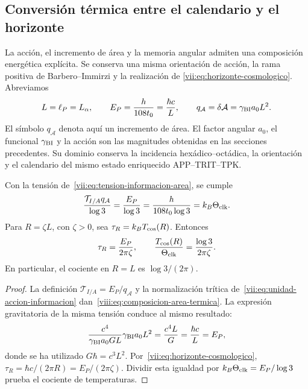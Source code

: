 
\subsection{Conversión térmica entre el calendario y el horizonte}
\label{viii:subsec:conversion-termica-calendario-horizonte}

La acción, el incremento de área y la memoria angular admiten una
composición energética explícita. Se conserva una misma orientación de
acción, la rama positiva de Barbero--Immirzi y la realización de
\eqref{vii:eq:horizonte-cosmologico}. Abreviamos
\[
 L=\ell_P=L_\alpha,\qquad
 E_P=\frac{h}{108t_0}=\frac{\hbar c}{L},\qquad
 q_{\mathcal A}=\delta\mathcal A=\gamma_{\rm BI}a_0L^2.
\]
El símbolo \(q_{\mathcal A}\) denota aquí un incremento de área.
El factor angular \(a_0\), el funcional \(\gamma_{\rm BI}\) y
la acción son las magnitudes obtenidas en las secciones precedentes.
Su dominio conserva la incidencia hexádico--octádica, la orientación y
el calendario del mismo estado enriquecido APP--TRIT--TPK.

\begin{proposition}
\label{viii:prop:composicion-area-termica}
Con la tensión de~\eqref{vii:eq:tension-informacion-area}, se cumple
\begin{equation}
 \frac{\mathcal T_{I/A}q_{\mathcal A}}{\log3}
 =\frac{E_P}{\log3}
 =\frac{h}{108t_0\log3}
 =k_B\Theta_{\rm clk}.
 \label{viii:eq:composicion-area-termica}
\end{equation}
Para \(R=\zeta L\), con \(\zeta>0\), sea
\(\tau_R=k_BT_{\rm cos}(R)\). Entonces
\begin{equation}
 \tau_R=\frac{E_P}{2\pi\zeta},\qquad
 \frac{T_{\rm cos}(R)}{\Theta_{\rm clk}}
 =\frac{\log3}{2\pi\zeta}.
 \label{viii:eq:conversion-dos-temperaturas}
\end{equation}
En particular, el cociente en \(R=L\) es \(\log3/(2\pi)\).
\end{proposition}
\begin{proof}
La definición \(\mathcal T_{I/A}=E_P/q_{\mathcal A}\) y la
normalización trítica de~\eqref{vii:eq:unidad-accion-informacion}
dan~\eqref{viii:eq:composicion-area-termica}. La expresión
gravitatoria de la misma tensión conduce al mismo resultado:
\[
 \frac{c^4}{\gamma_{\rm BI}a_0GL}
        \gamma_{\rm BI}a_0L^2
 =\frac{c^4L}{G}=\frac{\hbar c}{L}=E_P,
\]
donde se ha utilizado \(G\hbar=c^3L^2\).
Por~\eqref{vii:eq:horizonte-cosmologico},
\(\tau_R=\hbar c/(2\pi R)=E_P/(2\pi\zeta)\).
Dividir esta igualdad por \(k_B\Theta_{\rm clk}=E_P/\log3\)
prueba el cociente de temperaturas.
\end{proof}

